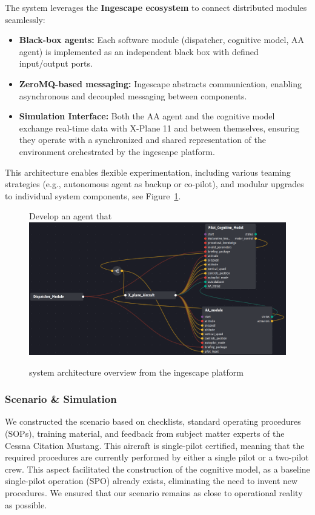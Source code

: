 \documentclass[12pt,a4paper]{article} %
\begin{document}
	The system leverages the \textbf{Ingescape ecosystem} to connect distributed modules seamlessly: \begin{itemize} \item \textbf{Black-box agents:} Each software module (dispatcher, cognitive model, AA agent) is implemented as an independent black box with defined input/output ports. \item \textbf{ZeroMQ-based messaging:} Ingescape abstracts communication, enabling asynchronous and decoupled messaging between components. \item \textbf{Simulation Interface:} Both the AA agent and the cognitive model exchange real-time data with X-Plane 11 and between themselves, ensuring they operate with a synchronized and shared representation of the environment orchestrated by the ingescape platform. \end{itemize}

	This architecture enables flexible experimentation, including various teaming strategies (e.g., autonomous agent as backup or co-pilot), and modular upgrades to individual system components, see Figure~\ref{fig:ingescape_platform}.

	\begin{figure}[h!]Develop an agent that 
		\centering
		\includegraphics[width=1.0\textwidth]{./images/ingescape_platform.png}
		\caption{system architecture overview from the ingescape platform}
		\label{fig:ingescape_platform}
	\end{figure}

	\subsubsection{Scenario \& Simulation}
	We constructed the scenario based on checklists, standard operating procedures (SOPs), training material, and feedback from subject matter experts of the Cessna Citation Mustang. This aircraft is single-pilot certified, meaning that the required procedures are currently performed by either a single pilot or a two-pilot crew. This aspect facilitated the construction of the cognitive model, as a baseline single-pilot operation (SPO) already exists, eliminating the need to invent new procedures. We ensured that our scenario remains as close to operational reality as possible.
\end{document}
